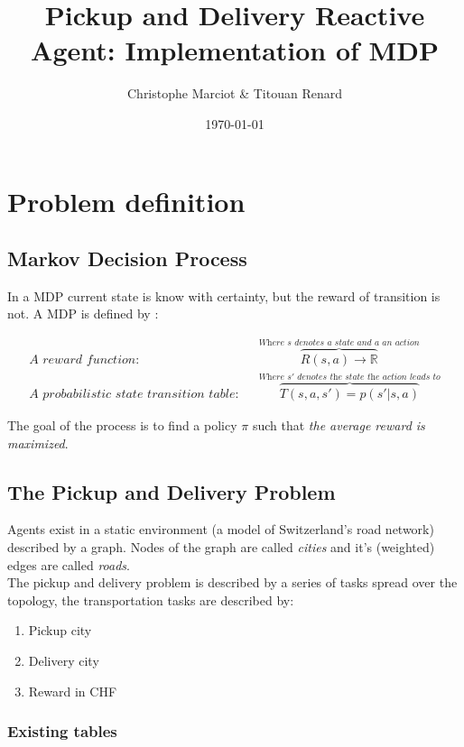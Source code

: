 \documentclass[11pt]{article}
\title{Pickup and Delivery Reactive Agent: Implementation of MDP}
\date{\today}
\author{Christophe Marciot \& Titouan Renard}
\begin{document}
\maketitle	

\section{Problem definition}

\subsection{Markov Decision Process}

In a MDP current state is know with certainty, but the reward of transition is not. A MDP is defined by : 

\begin{align*}
    \textit{A reward function:} && \overbrace{R(s,a) \rightarrow \mathbb{R}}^{\textit{Where $s$ denotes a state and $a$ an action}} \\
    \textit{A probabilistic state transition table:} && \overbrace{T(s,a,s') = p(s'|s,a)}^{\textit{Where $s'$ denotes the state the action leads to}}
\end{align*}

The goal of the process is to find a policy $\pi$ such that \textit{the average reward is maximized}.

\subsection{The Pickup and Delivery Problem}

Agents exist in a static environment (a model of Switzerland's road network) described by a graph. Nodes of the graph are called \textit{cities} and it's (weighted) edges are called \textit{roads}. \\

The pickup and delivery problem is described by a series of tasks spread over the topology, the transportation tasks are described by: 

\begin{enumerate}
    \item Pickup city
    \item Delivery city
    \item Reward in CHF
\end{enumerate}

\subsubsection{Existing tables}
\end{document}

